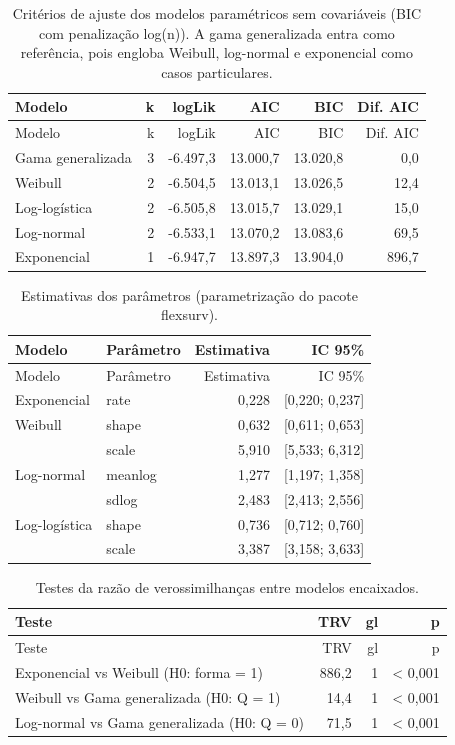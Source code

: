 \documentclass[
  brazilian,
]{article}
\begin{document}
\begin{longtable}[]{@{}lrrrrr@{}}
\caption{Critérios de ajuste dos modelos paramétricos sem covariáveis
(BIC com penalização log(n)). A gama generalizada entra como referência,
pois engloba Weibull, log-normal e exponencial como casos
particulares.}\tabularnewline
\toprule\noalign{}
Modelo & k & logLik & AIC & BIC & Dif. AIC \\
\midrule\noalign{}
\endfirsthead
\toprule\noalign{}
Modelo & k & logLik & AIC & BIC & Dif. AIC \\
\midrule\noalign{}
\endhead
\bottomrule\noalign{}
\endlastfoot
Gama generalizada & 3 & -6.497,3 & 13.000,7 & 13.020,8 & 0,0 \\
Weibull & 2 & -6.504,5 & 13.013,1 & 13.026,5 & 12,4 \\
Log-logística & 2 & -6.505,8 & 13.015,7 & 13.029,1 & 15,0 \\
Log-normal & 2 & -6.533,1 & 13.070,2 & 13.083,6 & 69,5 \\
Exponencial & 1 & -6.947,7 & 13.897,3 & 13.904,0 & 896,7 \\
\end{longtable}

\begin{longtable}[]{@{}llrr@{}}
\caption{Estimativas dos parâmetros (parametrização do pacote
flexsurv).}\tabularnewline
\toprule\noalign{}
Modelo & Parâmetro & Estimativa & IC 95\% \\
\midrule\noalign{}
\endfirsthead
\toprule\noalign{}
Modelo & Parâmetro & Estimativa & IC 95\% \\
\midrule\noalign{}
\endhead
\bottomrule\noalign{}
\endlastfoot
Exponencial & rate & 0,228 & {[}0,220; 0,237{]} \\
Weibull & shape & 0,632 & {[}0,611; 0,653{]} \\
& scale & 5,910 & {[}5,533; 6,312{]} \\
Log-normal & meanlog & 1,277 & {[}1,197; 1,358{]} \\
& sdlog & 2,483 & {[}2,413; 2,556{]} \\
Log-logística & shape & 0,736 & {[}0,712; 0,760{]} \\
& scale & 3,387 & {[}3,158; 3,633{]} \\
\end{longtable}

\begin{longtable}[]{@{}lrrr@{}}
\caption{Testes da razão de verossimilhanças entre modelos
encaixados.}\tabularnewline
\toprule\noalign{}
Teste & TRV & gl & p \\
\midrule\noalign{}
\endfirsthead
\toprule\noalign{}
Teste & TRV & gl & p \\
\midrule\noalign{}
\endhead
\bottomrule\noalign{}
\endlastfoot
Exponencial vs Weibull (H0: forma = 1) & 886,2 & 1 & \textless{}
0,001 \\
Weibull vs Gama generalizada (H0: Q = 1) & 14,4 & 1 & \textless{}
0,001 \\
Log-normal vs Gama generalizada (H0: Q = 0) & 71,5 & 1 & \textless{}
0,001 \\
\end{longtable}
\end{document}
